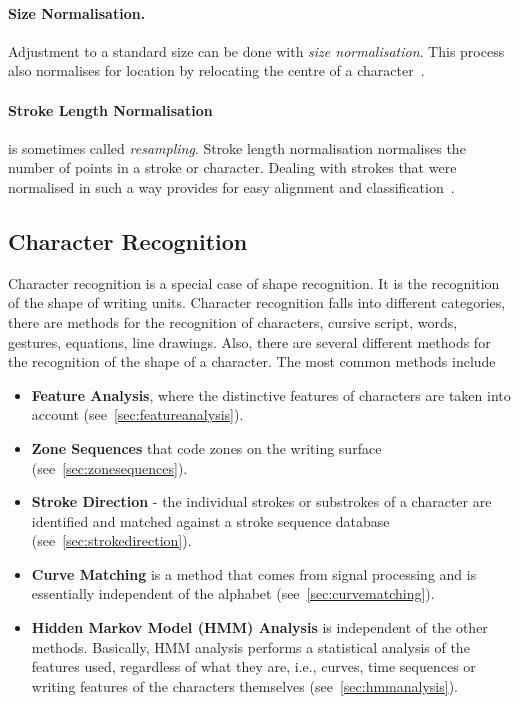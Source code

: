 \paragraph{Size Normalisation.}
Adjustment to a standard size can be done with \emph{size normalisation}. This 
process also normalises for location by relocating the centre of a 
character~.

\paragraph{Stroke Length Normalisation}
is sometimes called \emph{resampling}. Stroke length normalisation normalises
the number of points in a stroke or character. Dealing with strokes that were 
normalised in such a way provides for easy alignment and 
classification~. 

\subsection{Character Recognition}
\label{sec:characterrecognition}


Character recognition is a special case of shape recognition. It is the 
recognition of the shape of writing units. Character recognition falls into
different categories, there are methods for the recognition of characters,
cursive script, words, gestures, equations, line drawings. Also, there are 
several different methods for the recognition of the shape of a character.
The most common methods include 
\begin{itemize}
  \item \textbf{Feature Analysis}, where the distinctive features of characters 
    are taken into account (see~\ref{sec:featureanalysis}).
  \item \textbf{Zone Sequences} that code zones on the writing surface
    (see~\ref{sec:zonesequences}).
  \item \textbf{Stroke Direction} - the individual strokes or substrokes of a
    character are identified and matched against a stroke sequence database
    (see~\ref{sec:strokedirection}).
  \item \textbf{Curve Matching} is a method that comes from signal processing
    and is essentially independent of the alphabet (see~\ref{sec:curvematching}).
  \item \textbf{Hidden Markov Model (HMM) Analysis} is independent of the other methods.
    Basically, HMM analysis performs a statistical analysis of the features used, 
    regardless of what they are, i.e., curves, time sequences or writing features
    of the characters themselves (see~\ref{sec:hmmanalysis}).
\end{itemize}

